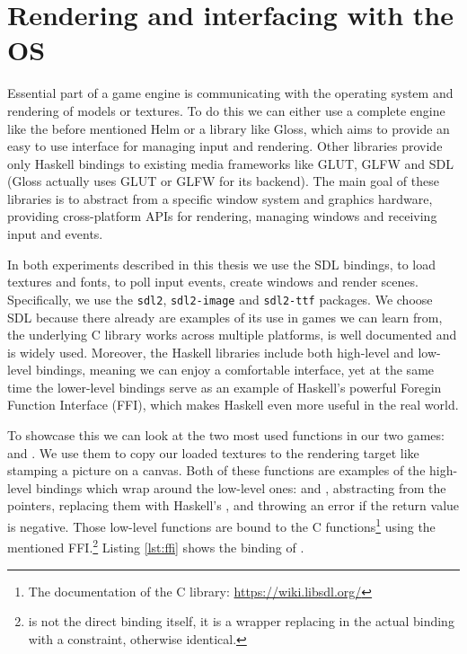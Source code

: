 \documentclass[
  digital, %
  color,   %
  table,   %
  oneside, %
  lof,     %
  lot,     %
]{fithesis3}
\newcommand{\packagename}{\texttt}
\begin{document}
\section{Rendering and interfacing with the OS}
\label{sect:aboutsdl}
Essential part of a game engine is communicating with the operating system
and rendering of models or textures. To do this we can
either use a complete engine like the before mentioned Helm or
a library like Gloss\cite{?}, which aims to provide an easy to use
interface for managing input and rendering. Other libraries
provide only Haskell bindings to existing media frameworks like GLUT, GLFW and SDL
(Gloss actually uses GLUT or GLFW for its backend). The main goal of these libraries is
to abstract from a specific window system and graphics hardware, providing
cross-platform APIs for rendering, managing windows and receiving input and events.

In both experiments described in this thesis we use the SDL bindings,
to load textures and fonts, to poll input events, create windows and render scenes.
Specifically, we use the \packagename{sdl2}, \packagename{sdl2-image}
and \packagename{sdl2-ttf} packages. We choose SDL because there already
are examples of its use in games we can learn from,
the underlying C library works across multiple platforms,
is well documented and is widely used. Moreover, the Haskell libraries
include both high-level and low-level bindings, meaning we can
enjoy a comfortable interface, yet at the same time the
lower-level bindings serve as an example of
Haskell's powerful Foregin Function Interface (FFI), which
makes Haskell even more useful in the real world.

To showcase this we can look at the two most used functions in
our two games:  and .
We use them to copy our loaded textures to the rendering target like stamping
a picture on a canvas. Both of these functions are examples of the high-level
bindings which wrap around the low-level ones: 
and ,
abstracting from the pointers, replacing them with Haskell's ,
and throwing an error if the return value is negative. Those low-level functions
are bound to the C functions\footnote{
    The documentation of the C library: \url{https://wiki.libsdl.org/}
} 
using the mentioned FFI.\footnote{
     is not the direct binding itself,
    it is a wrapper replacing  in the actual binding 
    with a  constraint, otherwise identical.
}
Listing \ref{lst:ffi} shows the binding of .
\end{document}
